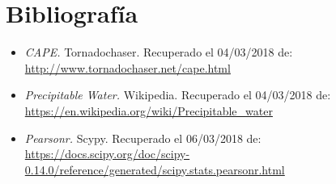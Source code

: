 \documentclass[a4paper]{article}
\begin{document}
\section{Bibliografía}
\begin{itemize}
\item \textit{CAPE.} Tornadochaser. Recuperado el 04/03/2018 de: \url{http://www.tornadochaser.net/cape.html}

\item \textit{Precipitable Water.} Wikipedia. Recuperado el 04/03/2018 de: \url{https://en.wikipedia.org/wiki/Precipitable_water}

\item \textit{Pearsonr.} Scypy. Recuperado el 06/03/2018 de: \url{https://docs.scipy.org/doc/scipy-0.14.0/reference/generated/scipy.stats.pearsonr.html}
\end{itemize}
\end{document}
